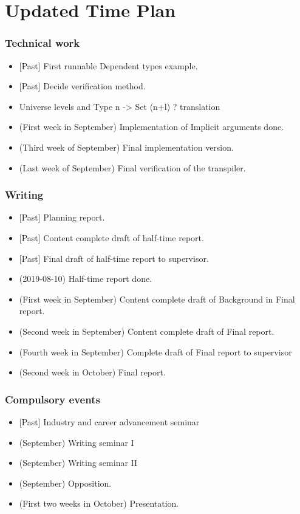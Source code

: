 \documentclass[parskip=half]{scrartcl}
\begin{document}
\newpage
\section{Updated Time Plan}

\subsubsection*{Technical work}
\begin{itemize}

  \item \textit{\color{gray}}[Past] First runnable Dependent types example.
  \item \textit{\color{gray}}[Past] Decide verification method.

  \item Universe levels and Type n -> Set (n+l) ? translation
  \item (First week in September) Implementation of Implicit arguments done.
  \item (Third week of September) Final implementation version.
  \item (Last week of September) Final verification of the transpiler.
\end{itemize}

\subsubsection*{Writing}
\begin{itemize}
  \item \textit{\color{gray}}[Past] Planning report.
  \item \textit{\color{gray}}[Past] Content complete draft of half-time report.
  \item \textit{\color{gray}}[Past] Final draft of half-time report to supervisor.
  \item (2019-08-10) Half-time report done.
  \item (First week in September) Content complete draft of Background in Final
    report.
  \item (Second week in September) Content complete draft of Final report.
  \item (Fourth week in September) Complete draft of Final report to supervisor
  \item (Second week in October) Final report.
\end{itemize}

\subsubsection*{Compulsory events}
\begin{itemize}
  \item \textit{\color{gray}}[Past] Industry and career advancement seminar
  \item (September) Writing seminar I
  \item (September) Writing seminar II
  \item (September) Opposition.
  \item (First two weeks in October) Presentation.
\end{itemize}
\end{document}
